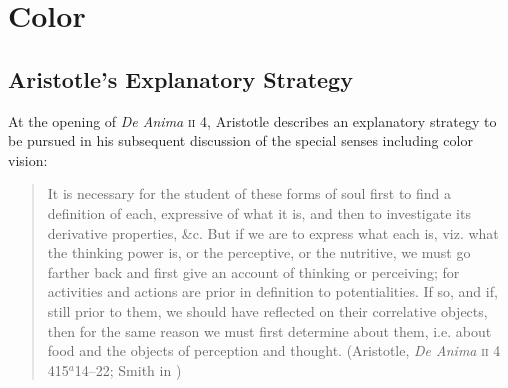 \chapter{Color} %
\label{cha:color}

\section{Aristotle's Explanatory Strategy} %
\label{sec:aristotle_s_explanatory_strategy}

At the opening of \emph{De Anima} \textsc{ii} 4, Aristotle describes an explanatory strategy to be pursued in his subsequent discussion of the special senses including color vision:
\begin{quote}
	It is necessary for the student of these forms of soul first to find a definition of each, expressive of what it is, and then to investigate its derivative properties, \&c. But if we are to express what each is, viz. what the thinking power is, or the perceptive, or the nutritive, we must go farther back and first give an account of thinking or perceiving; for activities and actions are prior in definition to potentialities. If so, and if, still prior to them, we should have reflected on their correlative objects, then for the same reason we must first determine about them, i.e. about food and the objects of perception and thought. (Aristotle, \emph{De Anima} \textsc{ii} 4 415\( ^{a} \)14--22; Smith in \citealt[26]{Barnes:1984uq})
\end{quote}
